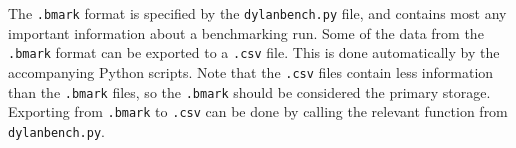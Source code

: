 \documentclass [letterpaper, 10pt, notitlepage, fleqn, oneside, 
  landscape] {article}
\begin{document}
\begin{multicols}{2}
The \texttt{.bmark} format is specified by the \texttt{dylanbench.py} 
file, and contains most any important information about a benchmarking run. 
Some of the data from the \texttt{.bmark} format can be exported to a 
\texttt{.csv} file. This is done automatically by the accompanying 
Python scripts. Note that the \texttt{.csv} files contain less information 
than the \texttt{.bmark} files, so the \texttt{.bmark} should be considered 
the primary storage. Exporting from \texttt{.bmark} to \texttt{.csv} can be done 
by calling the relevant function from \texttt{dylanbench.py}.

\end{multicols}
\end{document}
